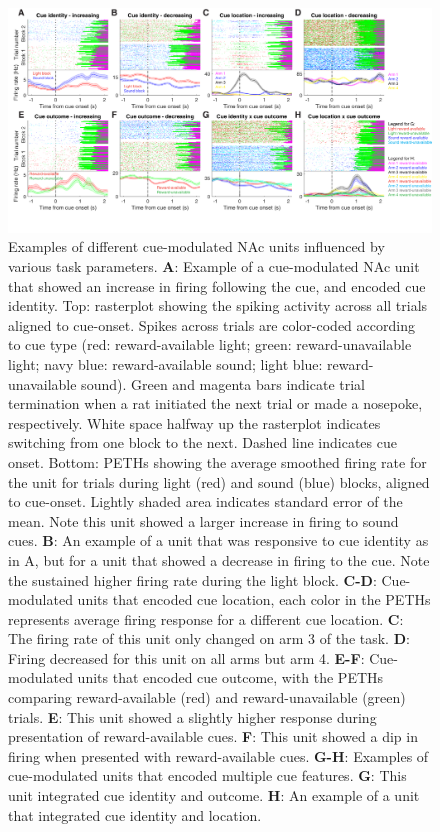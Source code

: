 \documentclass[11pt]{article}
\newcommand{\bsf}[1]{\textbf{#1}}
\begin{document}
\begin{figure}[h]
\centering
\includegraphics[width=\textwidth]{Fig 5 - Neural examples.png}
\caption{Examples of different cue-modulated NAc units influenced by various
  task parameters. \bsf{A}: Example of a cue-modulated NAc unit that showed an
  increase in firing following the cue, and encoded cue identity. Top:
  rasterplot showing the spiking activity across all trials aligned to
  cue-onset. Spikes across trials are color-coded according to cue type (red:
  reward-available light; green: reward-unavailable light; navy blue:
  reward-available sound; light blue: reward-unavailable sound). Green and
  magenta bars indicate trial termination when a rat initiated the next trial or
  made a nosepoke, respectively. White space halfway up the rasterplot indicates
  switching from one block to the next. Dashed line indicates cue onset. Bottom:
  PETHs showing the average smoothed firing rate for the unit for trials during
  light (red) and sound (blue) blocks, aligned to cue-onset. Lightly shaded area
  indicates standard error of the mean. Note this unit showed a larger increase
  in firing to sound cues. \bsf{B}: An example of a unit that was responsive to
  cue identity as in A, but for a unit that showed a decrease in firing to the
  cue. Note the sustained higher firing rate during the light block. \bsf{C-D}:
  Cue-modulated units that encoded cue location, each color in the PETHs
  represents average firing response for a different cue location. \bsf{C}: The
  firing rate of this unit only changed on arm 3 of the task. \bsf{D}: Firing
  decreased for this unit on all arms but arm 4. \bsf{E-F}: Cue-modulated units
  that encoded cue outcome, with the PETHs comparing reward-available (red) and
  reward-unavailable (green) trials. \bsf{E}: This unit showed a slightly higher
  response during presentation of reward-available cues. \bsf{F}: This unit
  showed a dip in firing when presented with reward-available cues. \bsf{G-H}:
  Examples of cue-modulated units that encoded multiple cue features. \bsf{G}:
  This unit integrated cue identity and outcome. \bsf{H}: An example of a unit
  that integrated cue identity and location.}
\label{fig:examples}
\end{figure}
\end{document}
